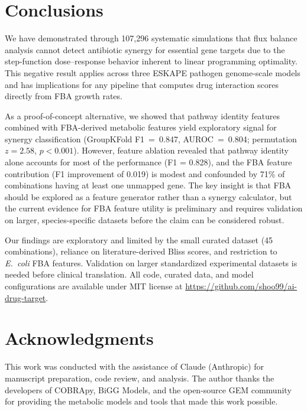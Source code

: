 \documentclass[12pt,a4paper]{article}
\begin{document}
\section{Conclusions}

We have demonstrated through 107,296 systematic simulations that flux balance analysis cannot detect antibiotic synergy for essential gene targets due to the step-function dose--response behavior inherent to linear programming optimality. This negative result applies across three ESKAPE pathogen genome-scale models and has implications for any pipeline that computes drug interaction scores directly from FBA growth rates.

As a proof-of-concept alternative, we showed that pathway identity features combined with FBA-derived metabolic features yield exploratory signal for synergy classification (GroupKFold F1~=~0.847, AUROC~=~0.804; permutation $z = 2.58$, $p < 0.001$). However, feature ablation revealed that pathway identity alone accounts for most of the performance (F1 = 0.828), and the FBA feature contribution (F1 improvement of 0.019) is modest and confounded by 71\% of combinations having at least one unmapped gene. The key insight is that FBA should be explored as a feature generator rather than a synergy calculator, but the current evidence for FBA feature utility is preliminary and requires validation on larger, species-specific datasets before the claim can be considered robust.

Our findings are exploratory and limited by the small curated dataset (45 combinations), reliance on literature-derived Bliss scores, and restriction to \textit{E.\ coli} FBA features. Validation on larger standardized experimental datasets is needed before clinical translation. All code, curated data, and model configurations are available under MIT license at \url{https://github.com/shoo99/ai-drug-target}.

\section*{Acknowledgments}

This work was conducted with the assistance of Claude (Anthropic) for manuscript preparation, code review, and analysis. The author thanks the developers of COBRApy, BiGG Models, and the open-source GEM community for providing the metabolic models and tools that made this work possible.
\end{document}
